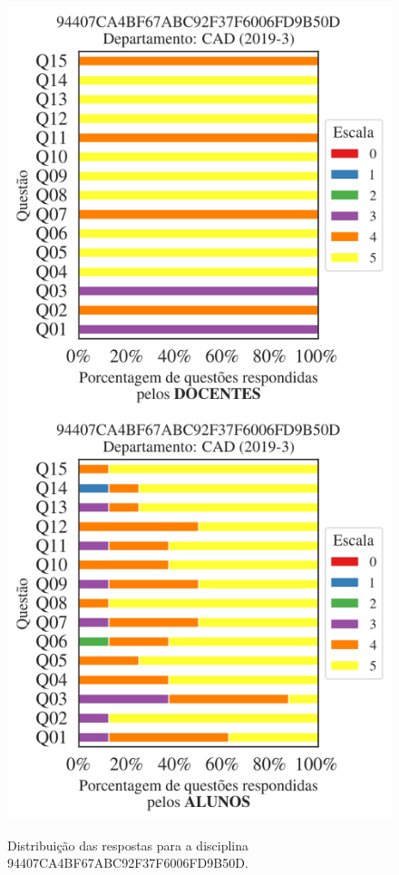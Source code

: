 \documentclass[a4paper,10pt]{article}
\begin{document}
\begin{figure}[h]
\centering
\includegraphics[width=0.485\linewidth]{analise_disciplina_departamento_CAD_94407CA4BF67ABC92F37F6006FD9B50D_docentes.png}
\includegraphics[width=0.485\linewidth]{analise_disciplina_departamento_CAD_94407CA4BF67ABC92F37F6006FD9B50D_alunos.png}
\caption{\label{fig:analise_geral_departamento}                Distribuição das respostas para a disciplina 94407CA4BF67ABC92F37F6006FD9B50D. }
\end{figure}
\end{document}
